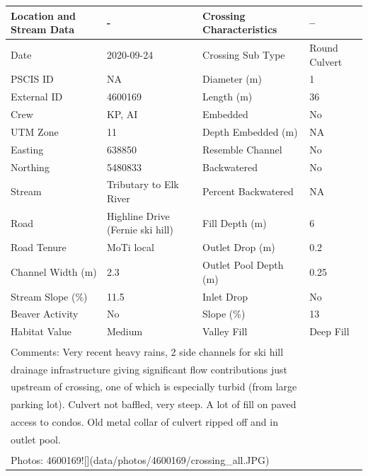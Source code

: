 \documentclass[
]{book}
\begin{document}
\begin{tabular}{llll}
\toprule
Location and Stream Data & - & Crossing Characteristics & --\\
\midrule
Date & 2020-09-24 & Crossing Sub Type & Round Culvert\\
PSCIS ID & NA & Diameter (m) & 1\\
External ID & 4600169 & Length (m) & 36\\
Crew & KP, AI & Embedded & No\\
UTM Zone & 11 & Depth Embedded (m) & NA\\
\addlinespace
Easting & 638850 & Resemble Channel & No\\
Northing & 5480833 & Backwatered & No\\
Stream & Tributary to Elk River & Percent Backwatered & NA\\
Road & Highline Drive (Fernie ski hill) & Fill Depth (m) & 6\\
Road Tenure & MoTi local & Outlet Drop (m) & 0.2\\
\addlinespace
Channel Width (m) & 2.3 & Outlet Pool Depth (m) & 0.25\\
Stream Slope (\%) & 11.5 & Inlet Drop & No\\
Beaver Activity & No & Slope (\%) & 13\\
Habitat Value & Medium & Valley Fill & Deep Fill\\
\bottomrule
\multicolumn{4}{l}{\textsuperscript{} Comments: Very recent heavy rains, 2 side channels for ski hill}\\
\multicolumn{4}{l}{drainage infrastructure giving significant flow contributions just}\\
\multicolumn{4}{l}{upstream of crossing, one of which is especially turbid (from large}\\
\multicolumn{4}{l}{parking lot). Culvert not baffled, very steep. A lot of fill on paved}\\
\multicolumn{4}{l}{access to condos. Old metal collar of culvert ripped off and in}\\
\multicolumn{4}{l}{outlet pool.}\\
\multicolumn{4}{l}{\textsuperscript{} Photos: 4600169![](data/photos/4600169/crossing\_all.JPG)}\\
\end{tabular}
\end{document}
